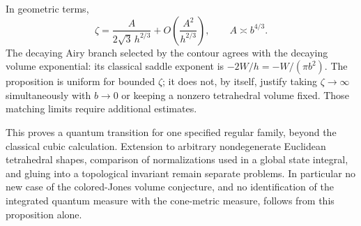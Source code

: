 In geometric terms,
\[
 \zeta=\frac{A}{2\sqrt3\,h^{2/3}}
          +O\!\left(\frac{A^2}{h^{2/3}}\right),
 \qquad A\asymp b^{4/3}.
\]
The decaying Airy branch selected by the contour agrees with
the decaying volume exponential: its classical saddle
exponent is $-2W/h=-W/(\pi b^2)$.
The proposition is uniform for bounded $\zeta$; it does not,
by itself, justify taking $\zeta\to\infty$ simultaneously
with $b\to0$ or keeping a nonzero tetrahedral volume fixed.
Those matching limits require additional estimates.

This proves a quantum transition for one specified regular
family, beyond the classical cubic calculation. Extension
to arbitrary nondegenerate Euclidean tetrahedral shapes,
comparison of normalizations used in a global state integral,
and gluing into a topological invariant remain separate
problems. In particular no new case of the colored-Jones
volume conjecture, and no identification of the integrated
quantum measure with the cone-metric measure, follows from
this proposition alone.

